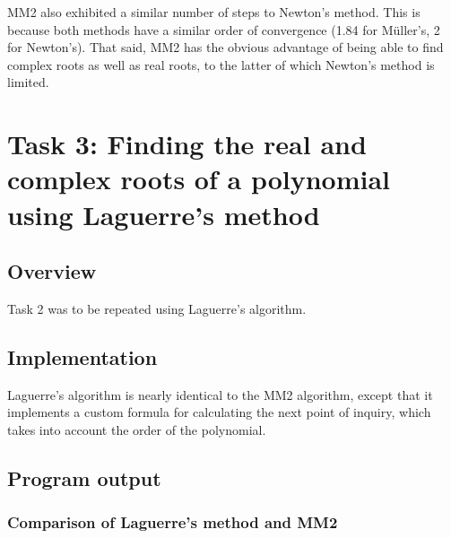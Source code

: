 \documentclass{article}
\begin{document}
	MM2 also exhibited a similar number of steps to Newton's method. This is
	because both methods have a similar order of convergence (1.84 for
	M{\"u}ller's, 2 for Newton's). That said, MM2 has the obvious advantage of
	being able to find complex roots as well as real roots, to the latter of
	which Newton's method is limited.
	
	\newpage
	\section{Task 3: Finding the real and complex roots of a polynomial using
	Laguerre's method}
	
	\subsection{Overview}
	
	Task 2 was to be repeated using Laguerre's algorithm.
	
	\subsection{Implementation}
	
	Laguerre's algorithm is nearly identical to the MM2 algorithm, except that
	it implements a custom formula for calculating the next point of inquiry,
	which takes into account the order of the polynomial.
	
	\subsection{Program output}
	
	\subsubsection{Comparison of Laguerre's method and MM2}
	
\end{document}
